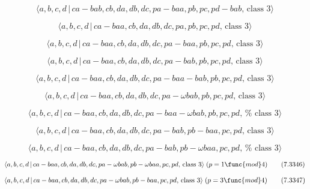 \documentclass[10pt]{article}
\begin{document}
\begin{equation}
\langle a,b,c,d\,|\,ca-bab,cb,da,db,dc,pa-baa,pb,pc,pd-bab,\,\text{class }%
3\rangle  \tag{7.3337}
\end{equation}

\begin{equation}
\langle a,b,c,d\,|\,ca-baa,cb,da,db,dc,pa,pb,pc,pd,\,\text{class }3\rangle 
\tag{7.3338}
\end{equation}

\begin{equation}
\langle a,b,c,d\,|\,ca-baa,cb,da,db,dc,pa-baa,pb,pc,pd,\,\text{class }%
3\rangle  \tag{7.3339}
\end{equation}

\begin{equation}
\langle a,b,c,d\,|\,ca-baa,cb,da,db,dc,pa-bab,pb,pc,pd,\,\text{class }%
3\rangle  \tag{7.3340}
\end{equation}

\begin{equation}
\langle a,b,c,d\,|\,ca-baa,cb,da,db,dc,pa-baa-bab,pb,pc,pd,\,\text{class }%
3\rangle  \tag{7.3341}
\end{equation}

\begin{equation}
\langle a,b,c,d\,|\,ca-baa,cb,da,db,dc,pa-\omega bab,pb,pc,pd,\,\text{class }%
3\rangle  \tag{7.3342}
\end{equation}

\begin{equation}
\langle a,b,c,d\,|\,ca-baa,cb,da,db,dc,pa-baa-\omega bab,pb,pc,pd,\,\text{%
class }3\rangle  \tag{7.3343}
\end{equation}

\begin{equation}
\langle a,b,c,d\,|\,ca-baa,cb,da,db,dc,pa-bab,pb-baa,pc,pd,\,\text{class }%
3\rangle  \tag{7.3344}
\end{equation}

\begin{equation}
\langle a,b,c,d\,|\,ca-baa,cb,da,db,dc,pa-bab,pb-\omega baa,pc,pd,\,\text{%
class }3\rangle  \tag{7.3345}
\end{equation}

\begin{equation}
\langle a,b,c,d\,|\,ca-baa,cb,da,db,dc,pa-\omega bab,pb-\omega baa,pc,pd,\,%
\text{class }3\rangle \;(p=1\func{mod}4)  \tag{7.3346}
\end{equation}

\begin{equation}
\langle a,b,c,d\,|\,ca-baa,cb,da,db,dc,pa-\omega bab,pb-baa,pc,pd,\,\text{%
class }3\rangle \;(p=3\func{mod}4)  \tag{7.3347}
\end{equation}
\end{document}

